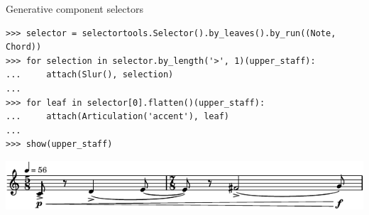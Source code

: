 \begin{frame}[fragile]{Generative component selectors}

\begin{abjadbookoutput}
\begin{singlespacing}
\vspace{-0.5\baselineskip}
\begin{verbatim}
>>> selector = selectortools.Selector().by_leaves().by_run((Note, Chord))
>>> for selection in selector.by_length('>', 1)(upper_staff):
...     attach(Slur(), selection)
...
>>> for leaf in selector[0].flatten()(upper_staff):
...     attach(Articulation('accent'), leaf)
...
>>> show(upper_staff)
\end{verbatim}
\noindent\includegraphics[max width=\textwidth,]{assets/lilypond-a7ec7b445307363d41998bfba7240e5f.pdf}
\end{singlespacing}
\end{abjadbookoutput}

\end{frame}

